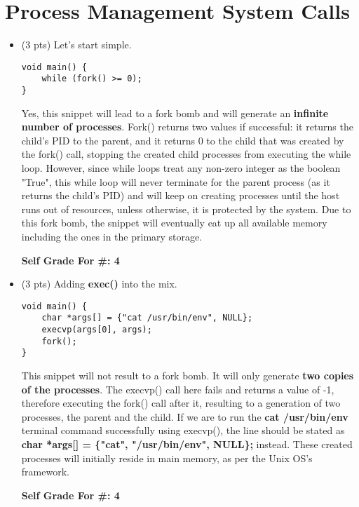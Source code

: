 \documentclass[conference]{IEEEtran}
\begin{document}
\section{Process Management System Calls}
\begin{itemize}
	\item (3 pts) Let's start simple.
\begin{lstlisting}
void main() {
    while (fork() >= 0);
}
\end{lstlisting}
Yes, this snippet will lead to a fork bomb and will generate an \textbf{infinite number of processes}. Fork() returns two values if successful: it returns the child's PID to the parent, and it returns 0 to the child that was created by the fork() call, stopping the created child processes from executing the while loop. However, since while loops treat any non-zero integer as the boolean "True", this while loop will never terminate for the parent process (as it returns the child's PID) and will keep on creating processes until the host runs out of resources, unless otherwise, it is protected by the system. Due to this fork bomb, the snippet will eventually eat up all available memory including the ones in the primary storage.
\begin{center}
	\textbf{Self Grade For \#: 4}
\end{center}
\end{itemize}
\begin{itemize}
	\item (3 pts) Adding \textbf{exec()} into the mix.
\begin{lstlisting}
void main() {
    char *args[] = {"cat /usr/bin/env", NULL};
    execvp(args[0], args);
    fork();
}
\end{lstlisting}
This snippet will not result to a fork bomb. It will only generate \textbf{two copies of the processes}. The execvp() call here fails and returns a value of -1, therefore executing the fork() call after it, resulting to a generation of two processes, the parent and the child. If we are to run the \textbf{cat /usr/bin/env} terminal command successfully using execvp(), the line should be stated as \textbf{char *args[] = \{"cat", "/usr/bin/env", NULL\};} instead. These created processes will initially reside in main memory, as per the Unix OS's framework.
\begin{center}
	\textbf{Self Grade For \#: 4}
\end{center}
\end{itemize}
\end{document}
